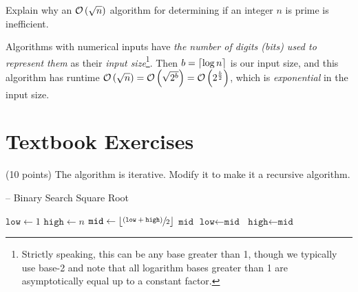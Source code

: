 \documentclass[final]{article}
\begin{document}
\begin{question}
    Explain why an $\mathcal{O}\left(\sqrt{n}\right)$ algorithm for determining if an integer $n$ is prime is inefficient.
\end{question}

\begin{solution}
    Algorithms with numerical inputs have \emph{the number of digits (bits) used to represent them} as their \emph{input size}\footnote{Strictly speaking, this can be any base greater than 1, though we typically use base-2 and note that all logarithm bases greater than 1 are asymptotically equal up to a constant factor.}. Then $b = \left\lceil\log{n}\right\rceil$ is our input size, and this algorithm has runtime $\mathcal{O}\left(\sqrt{n}\right) = \mathcal{O}\left(\sqrt{2^b}\right) = \mathcal{O}\left(2^{\frac{b}{2}}\right)$, which is \emph{exponential} in the input size.
\end{solution}

\section{Textbook Exercises}
\begin{exercise}{2.3}
    (10 points)
    The algorithm  is iterative. Modify it to make it a recursive algorithm.


    \begin{algorithm}[H]
        \caption[]{ -- Binary Search Square Root}
        \label{alg:binsqrt}
        \begin{algorithmic}[1]
            \State $\texttt{low} \gets 1$   
            \State $\texttt{high} \gets n$  
            \While{\True}
            \State $\texttt{mid} \gets \left\lfloor\sfrac{(\texttt{low} + \texttt{high})}{2}\right\rfloor$   
            \State \Return $\texttt{mid}$
             
            \State $\texttt{low} \gets \texttt{mid}$
            \Else {}
            \State $\texttt{high} \gets \texttt{mid}$
            \EndIf
            \EndWhile
            \EndFunction
        \end{algorithmic}
    \end{algorithm}
\end{exercise}
\end{document}
